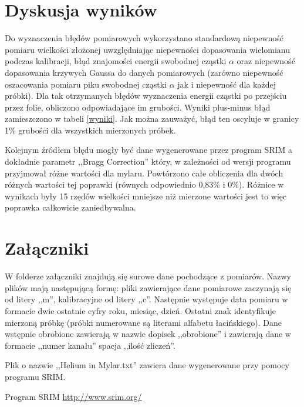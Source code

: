 \documentclass[12pt,a4paper]{article}
\begin{document}
\section{Dyskusja wyników}
Do wyznaczenia błędów pomiarowych wykorzystano standardową niepewność pomiaru wielkości złożonej uwzględniając niepewności dopasowania wielomianu podczas kalibracji, błąd znajomości energii swobodnej cząstki $\alpha$ oraz niepewność dopasowania krzywych Gaussa do danych pomiarowych (zarówno niepewność oszacowania pomiaru piku swobodnej cząstki $\alpha$ jak i niepewność dla każdej próbki). Dla tak otrzymanych błędów wyznaczenia energii cząstki po przejściu przez folie, obliczono odpowiadające im grubości. Wyniki plus-minus błąd zamieszczono w tabeli \ref{wyniki}. Jak można zauważyć, błąd ten oscyluje w granicy 1\% grubości dla wszystkich mierzonych próbek.

Kolejnym źródłem błędu mogły być dane wygenerowane przez program SRIM a dokładnie parametr ,,Bragg Correction'' który, w zależności od wersji programu przyjmował różne wartości dla mylaru. Powtórzono całe obliczenia dla dwóch różnych wartości tej poprawki (równych odpowiednio 0,83\% i 0\%). Różnice w wynikach były 15 rzędów wielkości mniejsze niż mierzone wartości jest to więc poprawka całkowicie zaniedbywalna. 

\section{Załączniki}
W folderze załączniki znajdują się surowe dane pochodzące z pomiarów. Nazwy plików mają następującą formę: pliki zawierające dane pomiarowe zaczynają się od litery ,,m'', kalibracyjne od litery ,,c''. Następnie występuje data pomiaru w formacie dwie ostatnie cyfry roku, miesiąc, dzień. Ostatni znak identyfikuje mierzoną próbkę (próbki numerowane są literami alfabetu łacińskiego). Dane wstępnie obrobione zawierają w nazwie dopisek ,,\textunderscore obrobione'' i zawierają dane w formacie ,,numer kanału'' spacja ,,ilość zliczeń''.

Plik o nazwie ,,Helium in Mylar.txt'' zawiera dane wygenerowane przy pomocy programu SRIM. 

\begin{thebibliography}{9}
Program SRIM
\url{http://www.srim.org/}
\end{thebibliography}
\end{document}

